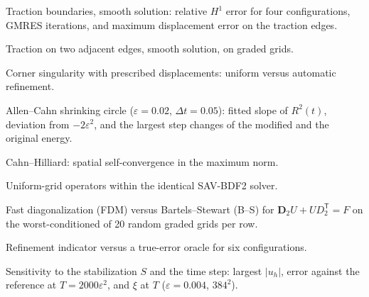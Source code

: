 \documentclass[11pt]{article}
\begin{document}
\begin{table}[htbp]\centering\small
\caption{Traction boundaries, smooth solution: relative $H^1$ error for four configurations, GMRES iterations, and maximum displacement error on the traction edges.}

\end{table}

\clearpage
\begin{table}[htbp]\centering\small
\caption{Traction on two adjacent edges, smooth solution, on graded grids.}

\end{table}

\begin{table}[htbp]\centering\small
\caption{Corner singularity with prescribed displacements: uniform versus automatic refinement.}

\end{table}

\begin{table}[htbp]\centering\small
\caption{Allen--Cahn shrinking circle ($\varepsilon=0.02$, $\Delta t=0.05$): fitted slope of $R^2(t)$, deviation from $-2\varepsilon^2$, and the largest step changes of the modified and the original energy.}

\end{table}

\clearpage
\begin{table}[htbp]\centering\small
\caption{Cahn--Hilliard: spatial self-convergence in the maximum norm.}

\end{table}

\begin{table}[htbp]\centering\small
\caption{Uniform-grid operators within the identical SAV-BDF2 solver.}

\end{table}

\begin{table}[htbp]\centering\small
\caption{Fast diagonalization (FDM) versus Bartels--Stewart (B--S) for $\mathbf D_2U+UD_2^{\mathsf T}=F$ on the worst-conditioned of 20 random graded grids per row.}

\end{table}

\clearpage
\begin{table}[htbp]\centering\small
\caption{Refinement indicator versus a true-error oracle for six configurations.}

\end{table}

\begin{table}[htbp]\centering\small
\caption{Sensitivity to the stabilization $S$ and the time step: largest $|u_h|$, error against the reference at $T=2000\varepsilon^2$, and $\xi$ at $T$ ($\varepsilon=0.004$, $384^2$).}

\end{table}
\end{document}
